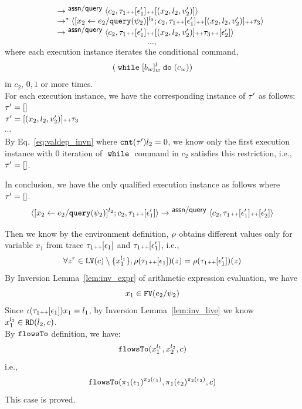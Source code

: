 \begin{subproof}
\begin{subproof}[Subproof]
\begin{enumerate}
\[\begin{array}{l}
  \\ \qquad
  \rightarrow^{\textsf{\small{ assn/query}}} 
  \langle {c}_2,  \mathtt{\tau}_1 {\scriptscriptstyle ++} [\mathtt{\epsilon}_1']{\scriptscriptstyle ++} [(x_2, l_2,  v_2')] \rangle 
  \\ \qquad
  \rightarrow^{*} 
  \langle [\mathrel{ {x}_2 \leftarrow e_2 / {\tt query}(\psi_2) }]^{l_2} ; {c}_2, 
  \mathtt{\tau}_1 {\scriptscriptstyle ++} [\mathtt{\epsilon}_1']{\scriptscriptstyle ++} [(x_2, l_2,  v_2')] {\scriptscriptstyle ++} \mathtt{\tau}_3 \rangle 
  \\ \qquad
  \rightarrow^{\textsf{\small{ assn/query}}} 
  \langle {c}_2,  \mathtt{\tau}_1 {\scriptscriptstyle ++} [\mathtt{\epsilon}_1']{\scriptscriptstyle ++} [(x_2, l_2,  v_2')] {\scriptscriptstyle ++} \mathtt{\tau}_3 {\scriptscriptstyle ++} [\mathtt{\epsilon}_2'] \rangle 
 \end{array}
 \]
\[
  \ldots,
\] 
where each execution instance iterates the conditional command, 
$$(\;\mathtt{while}\; [b_w]^l_w \;\mathtt{do}\; (c_w))$$ in $c_2$, $0, 1$ or more times.
%
\\
%
For each execution instance, we have the corresponding instance of $\mathtt{\tau}'$ as follows:
\\
$\mathtt{\tau}'  = [] $
\\
$\mathtt{\tau}' = [(x_2, l_2,  v_2')] {\scriptscriptstyle ++} \mathtt{\tau}_3 $
%
\\
$\cdots$
%
\\
%
By Eq.~\ref{eq:valdep_invn} where $\mathtt{cnt}(\mathtt{\tau}') l_2 = 0$,
%
we know only the first execution instance with 0 iteration of $\;\mathtt{while}\;$ command in $c_2$ satisfies this restriction, 
i.e., $\mathtt{\tau}' = []$.
%
\end{enumerate}
In conclusion, we have the only qualified execution instance as follows where $\mathtt{\tau}' = []$.
  \[
    \langle [\mathrel{ {x}_2 \leftarrow e_2 / {\tt query}(\psi_2) }]^{l_2} ; {c}_2, \mathtt{\tau}_1 {\scriptscriptstyle ++} [\mathtt{\epsilon}_1'] \rangle 
    \rightarrow^{\textsf{\small{ assn/query}}} 
    \langle {c}_2,  \mathtt{\tau}_1 {\scriptscriptstyle ++} [\mathtt{\epsilon}_1']{\scriptscriptstyle ++} [\mathtt{\epsilon}_2'] \rangle 
 \]
\end{subproof}
%
Then we know by the environment definition,
$\rho$ obtains different values only for variable $x_1$ 
from trace $\mathtt{\tau}_1 {\scriptscriptstyle ++} [\mathtt{\epsilon}_1]$ and 
$\mathtt{\tau}_1 {\scriptscriptstyle ++} [\mathtt{\epsilon}_1']$, i.e.,
\[
  \forall z^r \in \mathtt{LV}(c) \setminus \{x_1^{l_1}\} ,
  \rho(\mathtt{\tau}_1 {\scriptscriptstyle ++} [\mathtt{\epsilon}_1]) (z) =  
  \rho(\mathtt{\tau}_1 {\scriptscriptstyle ++} [\mathtt{\epsilon}_1']) (z)
\]
%
By {Inversion Lemma~\ref{lem:inv_expr}} of arithmetic expression evaluation, we have
\[
  x_1 \in  \mathtt{FV}(e_2 / \psi_2) 
\]
Since $\iota(\mathtt{\tau}_1 {\scriptscriptstyle ++} [\mathtt{\epsilon}_1]) x_1 = l_1$, 
by Inversion Lemma~\ref{lem:inv_live} we know $x_1^{l_1} \in \mathtt{RD}(l_2, c)$.
%
\\
%
By $\mathtt{flowsTo}$ definition, we have:
%
\[
\mathtt{flowsTo}(x_1^{l_1}, {x}_2^{l_2}, c)
\]
i.e.,
%
\[
\mathtt{flowsTo}(\pi_1(\mathtt{\epsilon}_1)^{\pi_2(\mathtt{\epsilon}_1)}, \pi_1(\mathtt{\epsilon}_2)^{\pi_2(\mathtt{\epsilon}_2)}, c)
 \]
%
This case is proved.
\end{subproof}